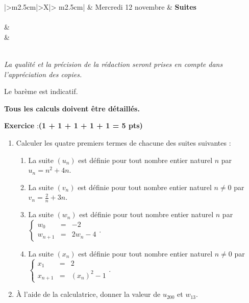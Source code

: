 \documentclass[10pt,french]{article}
\newcounter{exoc}
\newenvironment{exoc}[1]{%
  \refstepcounter{exoc}\textbf{Exercice \theexoc} :\hfill {\textbf{(#1)}}\par
  \medskip}%
{\medskip}
\begin{document}
\pieddepage{}{}{}

\begin{center}
\begin{tabularx}{\textwidth}{|>\centering m{2.5cm}|>\centering X|>{\centering\arraybackslash} m{2.5cm}|}
	\iere {} &  Mercredi 12 novembre  & \textbf{Suites} \\
	\hline
		 \\
	\hline
         &  \\
		 &  \\
	\hline
         \\[1cm]
    \hline
\end{tabularx}\bigskip

{\itshape
La qualité et la précision de la rédaction seront prises en compte dans l'appréciation des copies.\par
Le barème est indicatif.\par
\textbf{Tous les calculs doivent être détaillés.}}
\end{center}

\begin{exoc}{1 + 1 + 1 + 1 + 1 = 5 pts}
    \begin{enumerate}
        \item Calculer les quatre premiers termes de chacune des suites suivantes :
            \begin{enumerate}
                \item La suite $(u_n)$ est définie pour tout nombre entier naturel $n$ par $u_n = n^2 + 4n$.
                \item La suite $(v_n)$ est définie pour tout nombre entier naturel $n \neq 0$ par $v_n = \frac 2 n + 3n$.
                \item La suite $(w_n)$ est définie pour tout nombre entier naturel $n$ par $\left\{\begin{array}{rcl} w_0 & = & -2 \\ w_{n +1} &=& 2w_n - 4\end{array}\right.$.
                \item La suite $(x_n)$ est définie pour tout nombre entier naturel $n \neq 0$ par $\left\{\begin{array}{rcl} x_1 & = & 2 \\ x_{n +1} &=& (x_n)^2 - 1\end{array}\right.$.
            \end{enumerate}
        \item À l'aide de la calculatrice, donner la valeur de $u_{200}$ et $w_{13}$.
    \end{enumerate}
\end{exoc}
\end{document}
